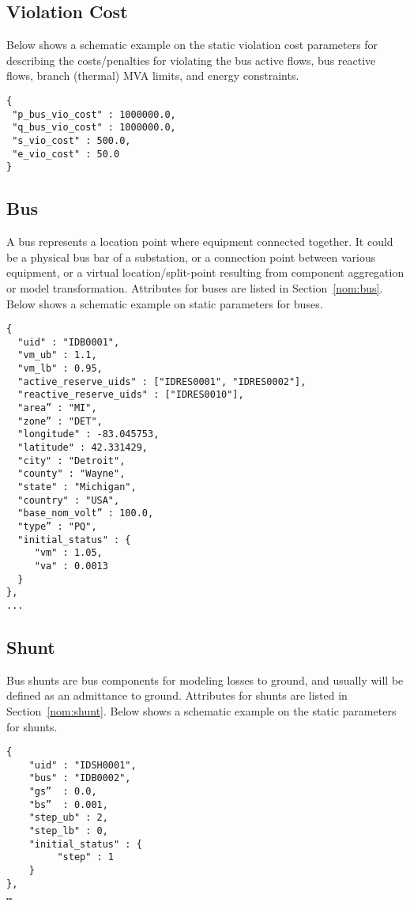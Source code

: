 \subsection{Violation Cost}
\label{sec:violation}
Below shows a schematic example on the static violation cost parameters for 
describing the costs/penalties for violating the bus active flows, bus reactive flows, 
branch (thermal) MVA limits, and energy constraints. 

\begin{verbatim}
{
 "p_bus_vio_cost" : 1000000.0,
 "q_bus_vio_cost" : 1000000.0,
 "s_vio_cost" : 500.0,
 "e_vio_cost" : 50.0
}
\end{verbatim}


\subsection{Bus}
\label{sec:bus}
A bus represents a location point where equipment connected together.
It could be a physical bus bar of a substation, or 
a connection point between various equipment, 
or a virtual location/split-point resulting from
component aggregation or model transformation.
Attributes for buses are listed in Section~\ref{nom:bus}.
Below shows a schematic example on static parameters for buses.
\begin{verbatim}
{
  "uid" : "IDB0001",
  "vm_ub" : 1.1,
  "vm_lb" : 0.95,
  "active_reserve_uids" : ["IDRES0001", "IDRES0002"],
  "reactive_reserve_uids" : ["IDRES0010"],
  "area” : "MI",
  "zone” : "DET",
  "longitude" : -83.045753,
  "latitude" : 42.331429,
  "city" : "Detroit",
  "county" : "Wayne",
  "state" : "Michigan",
  "country" : "USA",
  "base_nom_volt” : 100.0,
  "type” : "PQ",
  "initial_status" : {
     "vm" : 1.05,
     "va" : 0.0013
  }
},
...
\end{verbatim}


\subsection{Shunt}
\label{sec:shunt}
Bus shunts are bus components for modeling losses to ground, and 
usually will be defined as an admittance to ground.
Attributes for shunts are listed in Section~\ref{nom:shunt}.
Below shows a schematic example on the static parameters for shunts.
\begin{verbatim}
{
    "uid" : "IDSH0001",
    "bus" : "IDB0002",
    "gs”  : 0.0,
    "bs”  : 0.001,
    "step_ub" : 2,
    "step_lb" : 0,
    "initial_status" : {
         "step" : 1
    }
},
…    
\end{verbatim}



